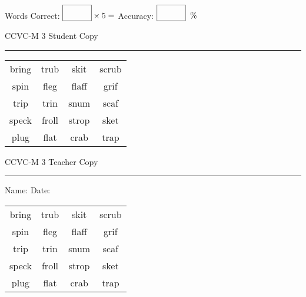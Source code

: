 \documentclass{memoir}
\begin{document}
\small

Words Correct: $\fbox{\phantom{\huge 100}} \times 5 = $ Accuracy: $\fbox{\phantom{\huge 100}}\;\; \%$ 

\vfill

\newpage


\footnotesize \noindent
CCVC-M 3 \hfill Student Copy
\smallskip
\hrule

\Large

\setlength{\tabcolsep}{14pt}
\def\arraystretch{3}

{\selectfont


\begin{vplace}[0.5]
\begin{center}
\begin{tabular}{cccc}
bring      & trub & skit & scrub \\
spin & fleg             & flaff & grif      \\
trip & trin & snum & scaf \\
speck & froll & strop & sket \\
plug & flat             & crab        & trap \\
\end{tabular}
\end{center}
\end{vplace}

}

\newpage

\footnotesize \noindent
CCVC-M 3 \hfill Teacher Copy
\smallskip
\hrule

\small

\vfill

\noindent
Name: \underline{\hspace{1.75in}} \hfill Date: \underline{\hspace{1in}}

\Large

{\selectfont


\begin{vplace}[0.5]
\begin{center}
\begin{tabular}{cccc}
bring      & trub & skit & scrub \\
spin & fleg             & flaff & grif      \\
trip & trin & snum & scaf \\
speck & froll & strop & sket \\
plug & flat             & crab        & trap \\
\end{tabular}
\end{center}
\end{vplace}



}
\end{document}
